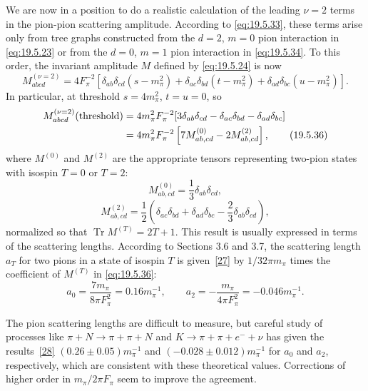 We are now in a position to do a realistic calculation of the leading $\nu=2$ terms in the pion-pion scattering amplitude. According to \eqref{eq:19.5.33}, these terms arise only from tree graphs constructed from the $d=2$, $m=0$ pion interaction in \eqref{eq:19.5.23} or from the $d=0$, $m=1$ pion interaction in \eqref{eq:19.5.34}. To this order, the invariant amplitude $M$ defined by \eqref{eq:19.5.24} is now
\begin{equation}
M_{abcd}^{(\nu=2)}
=4F_\pi^{-2}\left[
\delta_{ab}\delta_{cd}(s-m_\pi^2)
+\delta_{ac}\delta_{bd}(t-m_\pi^2)
+\delta_{ad}\delta_{bc}(u-m_\pi^2)
\right].
\tag{19.5.35}\label{eq:19.5.35}
\end{equation}
In particular, at threshold $s=4m_\pi^2$, $t=u=0$, so
\begin{align}
M_{abcd}^{(\nu=2)}(\text{threshold})
&=4m_\pi^2F_\pi^{-2}
[3\delta_{ab}\delta_{cd}
-\delta_{ac}\delta_{bd}-\delta_{ad}\delta_{bc}]
\notag\\
&=4m_\pi^2F_\pi^{-2}
\left[7M_{ab,cd}^{(0)}-2M_{ab,cd}^{(2)}\right],
\tag{19.5.36}\label{eq:19.5.36}
\end{align}
where $M^{(0)}$ and $M^{(2)}$ are the appropriate tensors representing two-pion states with isospin $T=0$ or $T=2$:
\begin{equation}
M_{ab,cd}^{(0)}=\frac{1}{3}\delta_{ab}\delta_{cd},
\tag{19.5.37}\label{eq:19.5.37}
\end{equation}
\begin{equation}
M_{ab,cd}^{(2)}
=\frac{1}{2}\left(
\delta_{ac}\delta_{bd}+\delta_{ad}\delta_{bc}
-\frac{2}{3}\delta_{ab}\delta_{cd}
\right),
\tag{19.5.38}\label{eq:19.5.38}
\end{equation}
normalized so that $\operatorname{Tr}M^{(T)}=2T+1$. This result is usually expressed in terms of the scattering lengths. According to Sections 3.6 and 3.7, the scattering length $a_T$ for two pions in a state of isospin $T$ is given~\hyperref[ch19-ref-27]{[27]} by $1/32\pi m_\pi$ times the coefficient of $M^{(T)}$ in \eqref{eq:19.5.36}:
\[
a_0=\frac{7m_\pi}{8\pi F_\pi^2}=0.16m_\pi^{-1},
\qquad
a_2=-\frac{m_\pi}{4\pi F_\pi^2}=-0.046m_\pi^{-1}.
\]

The pion scattering lengths are difficult to measure, but careful study of processes like $\pi+N\to\pi+\pi+N$ and $K\to\pi+\pi+e^-+\nu$ has given the results~\hyperref[ch19-ref-28]{[28]} $(0.26\mathbin{\pm}0.05)m_\pi^{-1}$ and $(-0.028\mathbin{\pm}0.012)m_\pi^{-1}$ for $a_0$ and $a_2$, respectively, which are consistent with these theoretical values. Corrections of higher order in $m_\pi/2\pi F_\pi$ seem to improve the agreement.

